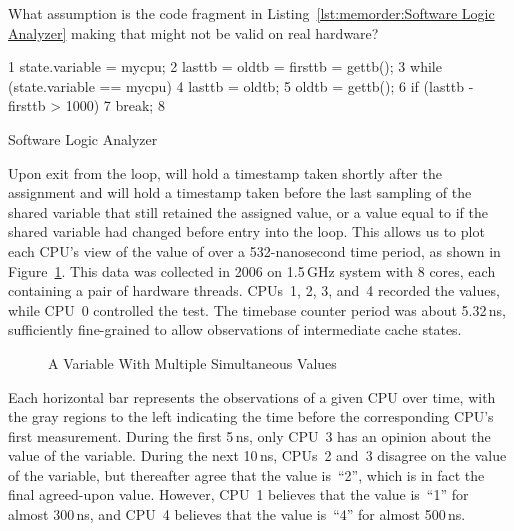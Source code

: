 \QuickQuiz{}
	What assumption is the code fragment
	in Listing~\ref{lst:memorder:Software Logic Analyzer}
	making that might not be valid on real hardware?
 \QuickQuizEnd

\begin{listing}[tbp]
{ \scriptsize
\begin{verbbox}
  1 state.variable = mycpu;
  2 lasttb = oldtb = firsttb = gettb();
  3 while (state.variable == mycpu) {
  4   lasttb = oldtb;
  5   oldtb = gettb();
  6   if (lasttb - firsttb > 1000)
  7     break;
  8 }
\end{verbbox}
}
\centering
\theverbbox
\caption{Software Logic Analyzer}
\label{lst:memorder:Software Logic Analyzer}
\end{listing}

Upon exit from the loop,  will hold a timestamp
taken shortly after the assignment and  will hold
a timestamp taken before the last sampling of the shared variable
that still retained the assigned value, or a value equal to 
if the shared variable had changed before entry into the loop.
This allows us to plot each CPU's view of the value of 
over a 532-nanosecond time period, as shown in
Figure~\ref{fig:memorder:A Variable With Multiple Simultaneous Values}.
This data was collected in 2006 on 1.5\,GHz  system with 8 cores,
each containing a pair of hardware threads.
CPUs~1, 2, 3, and~4 recorded the values, while CPU~0 controlled the test.
The timebase counter period was about 5.32\,ns, sufficiently fine-grained
to allow observations of intermediate cache states.

\begin{figure}[htb]
\centering
{}
\caption{A Variable With Multiple Simultaneous Values}
\label{fig:memorder:A Variable With Multiple Simultaneous Values}
\end{figure}

Each horizontal bar represents the observations of a given CPU over time,
with the gray regions to the left indicating the time before the
corresponding CPU's first measurement.
During the first 5\,ns, only CPU~3 has an opinion about the value of the
variable.
During the next 10\,ns, CPUs~2 and~3 disagree on the value of the variable,
but thereafter agree that the value is~``2'', which is in fact
the final agreed-upon value.
However, CPU~1 believes that the value is~``1'' for almost 300\,ns, and
CPU~4 believes that the value is~``4'' for almost 500\,ns.

